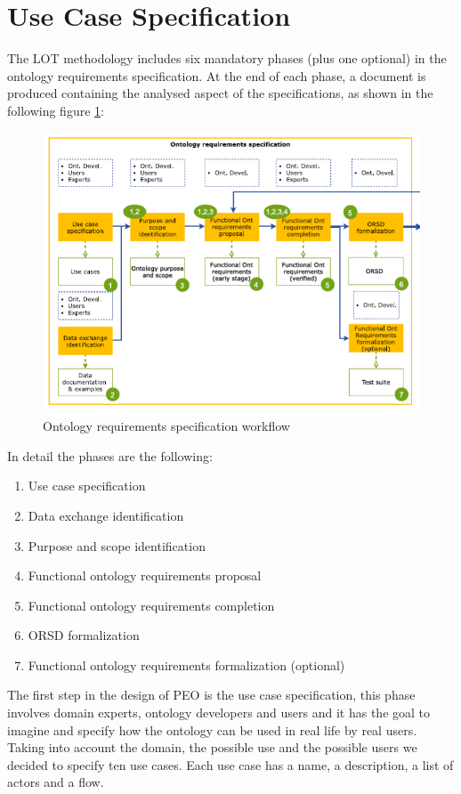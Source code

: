 \section{Use Case Specification}
The LOT methodology includes six mandatory phases (plus one optional) in the ontology requirements specification.
At the end of each phase, a document is produced containing the analysed aspect of the specifications, as shown in the following figure \ref{fig:13}:
\begin{figure}[H]
    \centering
    \includegraphics[width=0.9\linewidth]{Figures/fig_13.PNG}
    \caption{Ontology requirements specification workflow}
    \label{fig:13}
\end{figure}
In detail the phases are the following:
\begin{enumerate}
    \item Use case specification
    \item Data exchange identification
    \item Purpose and scope identification
    \item Functional ontology requirements proposal
    \item Functional ontology requirements completion
    \item ORSD formalization 
    \item Functional ontology requirements formalization (optional)
\end{enumerate}

The first step in the design of PEO is the use case specification, this phase involves domain experts, ontology developers and users and it has the goal to imagine and specify how the ontology can be used in real life by real users.
Taking into account the domain, the possible use and the possible users we decided to specify ten use cases.
Each use case has a name, a description, a list of actors and a flow.

